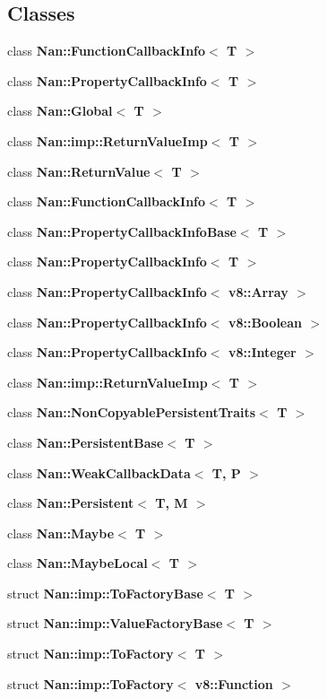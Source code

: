 \subsection*{Classes}
\begin{DoxyCompactItemize}
\item 
class \textbf{ Nan\+::\+Function\+Callback\+Info$<$ T $>$}
\item 
class \textbf{ Nan\+::\+Property\+Callback\+Info$<$ T $>$}
\item 
class \textbf{ Nan\+::\+Global$<$ T $>$}
\item 
class \textbf{ Nan\+::imp\+::\+Return\+Value\+Imp$<$ T $>$}
\item 
class \textbf{ Nan\+::\+Return\+Value$<$ T $>$}
\item 
class \textbf{ Nan\+::\+Function\+Callback\+Info$<$ T $>$}
\item 
class \textbf{ Nan\+::\+Property\+Callback\+Info\+Base$<$ T $>$}
\item 
class \textbf{ Nan\+::\+Property\+Callback\+Info$<$ T $>$}
\item 
class \textbf{ Nan\+::\+Property\+Callback\+Info$<$ v8\+::\+Array $>$}
\item 
class \textbf{ Nan\+::\+Property\+Callback\+Info$<$ v8\+::\+Boolean $>$}
\item 
class \textbf{ Nan\+::\+Property\+Callback\+Info$<$ v8\+::\+Integer $>$}
\item 
class \textbf{ Nan\+::imp\+::\+Return\+Value\+Imp$<$ T $>$}
\item 
class \textbf{ Nan\+::\+Non\+Copyable\+Persistent\+Traits$<$ T $>$}
\item 
class \textbf{ Nan\+::\+Persistent\+Base$<$ T $>$}
\item 
class \textbf{ Nan\+::\+Weak\+Callback\+Data$<$ T, P $>$}
\item 
class \textbf{ Nan\+::\+Persistent$<$ T, M $>$}
\item 
class \textbf{ Nan\+::\+Maybe$<$ T $>$}
\item 
class \textbf{ Nan\+::\+Maybe\+Local$<$ T $>$}
\item 
struct \textbf{ Nan\+::imp\+::\+To\+Factory\+Base$<$ T $>$}
\item 
struct \textbf{ Nan\+::imp\+::\+Value\+Factory\+Base$<$ T $>$}
\item 
struct \textbf{ Nan\+::imp\+::\+To\+Factory$<$ T $>$}
\item 
struct \textbf{ Nan\+::imp\+::\+To\+Factory$<$ v8\+::\+Function $>$}
\item 

\end{DoxyCompactItemize}
